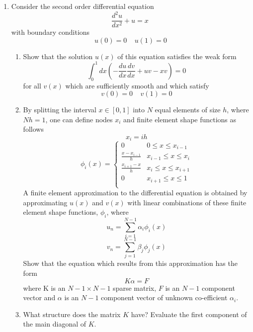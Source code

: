 \begin{enumerate}
\begin{enumerate}
	\end{enumerate}	
\item
	Consider the second order differential equation 
	\[\frac{d^2u}{dx^2}+u=x \ \]
	with boundary conditions
	\[u(0)=0 \ \ \ \ \ u(1)=0 \]
	\begin{enumerate}
		\item
		Show that the solution $u(x)$ of this equation satisfies the weak form
		\[ \int_{0}^{1} dx \left(-\frac{du}{dx}\frac{dv}{dx}+uv-xv \right) = 0\]
		for all $v(x)$ which are sufficiently smooth and which satisfy
		\[v(0)=0 \ \ \ \ \ v(1)=0 \]
		\item
		By splitting the interval $x\in [0,1]$ into $N$ equal elements of size $h$, where
		$Nh=1$, one can define nodes $x_i$ and finite element shape functions as 
		follows
		\[x_i=ih \]
		\[\phi_i(x)=\left\{\begin{array}{ll} 
		0 & 0\leq x \leq x_{i-1}\\
		\frac{x-x_{i-1}}{h} & x_{i-1}\leq x \leq x_{i}\\
		\frac{x_{i+1}-x}{h} & x_{i}\leq x \leq x_{i+1}\\
		0 & x_{i+1}\leq x \leq 1\\
		\end{array} \right. \]
		A finite element approximation to the differential equation is obtained by approximating $u(x)$ and $v(x)$ with linear combinations of these finite element shape
		functions, $\phi_i$, where
		\[ u_{n} = \sum_{i=1}^{N-1}\alpha_i \phi_i(x) \]
		\[ v_{n} = \sum_{j=1}^{N-1}\beta_j \phi_j(x) \]
		Show that the equation which results from this approximation has the form
		\[K\alpha= F \]
		where K is an $N-1 \times N-1$ sparse matrix, $F$ is an $N-1$ component vector
		and $\alpha$ is an $N-1$ component vector of unknown co-efficient $\alpha_i$.
		\item
		What structure does the matrix $K$ have?
		Evaluate the first component of the main diagonal of $K$.
\end{enumerate}

\end{enumerate}
